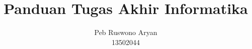 \documentclass[bahasa, 12pt, a4paper, onecolumn, oneside, final]{report}
\begin{document}
\title{Panduan Tugas Akhir Informatika}
\date{}
\author{Peb Ruswono Aryan\\
13502044}



\pagestyle{plain}









\end{document}
